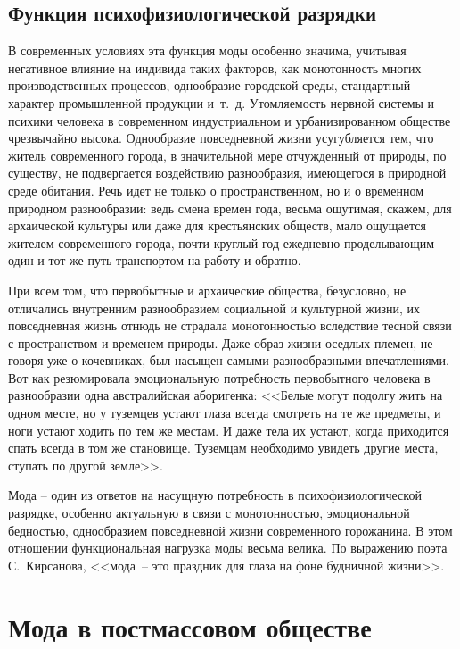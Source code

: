   \subsection{Функция психофизиологической разрядки}
  
  В современных условиях эта функция моды особенно значима, учитывая негативное
  влияние на индивида таких факторов, как монотонность многих производственных
  процессов, однообразие городской среды, стандартный характер промышленной
  продукции и~т.~д. Утомляемость нервной системы и психики человека в
  современном индустриальном и урбанизированном обществе чрезвычайно высока.
  Однообразие повседневной жизни усугубляется тем, что житель современного
  города, в значительной мере отчужденный от природы, по существу, не
  подвергается воздействию разнообразия, имеющегося в природной среде обитания.
  Речь идет не только о пространственном, но и о временном природном
  разнообразии: ведь смена времен года, весьма ощутимая, скажем, для
  архаической культуры или даже для крестьянских обществ, мало ощущается
  жителем современного города, почти круглый год ежедневно проделывающим один и
  тот же путь транспортом на работу и обратно.
  
  При всем том, что первобытные и архаические общества, безусловно, не
  отличались внутренним разнообразием социальной и культурной жизни, их
  повседневная жизнь отнюдь не страдала монотонностью вследствие тесной связи с
  пространством и временем природы. Даже образ жизни оседлых племен, не говоря
  уже о кочевниках, был насыщен самыми разнообразными впечатлениями. Вот как
  резюмировала эмоциональную потребность первобытного человека в разнообразии
  одна австралийская аборигенка: <<Белые могут подолгу жить на одном месте, но у
  туземцев устают глаза всегда смотреть на те же предметы, и ноги устают ходить
  по тем же местам. И даже тела их устают, когда приходится спать всегда в том
  же становище. Туземцам необходимо увидеть другие места, ступать по другой
  земле>>.
  
  Мода – один из ответов на насущную потребность в психофизиологической
  разрядке, особенно актуальную в связи с монотонностью, эмоциональной
  бедностью, однообразием повседневной жизни современного горожанина. В этом
  отношении функциональная нагрузка моды весьма велика. По выражению поэта
  С.~Кирсанова, <<мода~-- это праздник для глаза на фоне будничной
  жизни>>.~\cite{bib:3}
  
  \section{Мода в постмассовом обществе}

